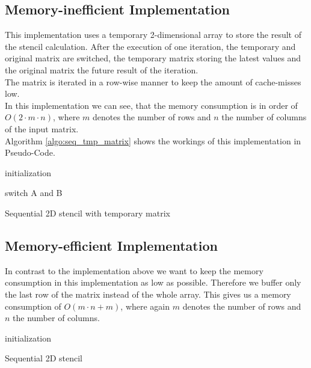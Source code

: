 \documentclass[11pt,a4paper]{article}
\begin{document}
\subsection{Memory-inefficient Implementation}
This implementation uses a temporary 2-dimensional array to store the result of the stencil calculation. After the execution of one iteration, the temporary and original matrix are switched, the temporary matrix storing the latest values and the original matrix the future result of the iteration.\\
The matrix is iterated in a row-wise manner to keep the amount of cache-misses low.\\
In this implementation we can see, that the memory consumption is in order of $O(2 \cdot m \cdot n)$, where $m$ denotes the number of rows and $n$ the number of columns of the input matrix.\\
Algorithm \ref{algo:seq_tmp_matrix} shows the workings of this implementation in Pseudo-Code.

\begin{algorithm}[H] \label{algo:seq_tmp_matrix}
 initialization\;
 
  {
  switch A and B
 }
 \caption{Sequential 2D stencil with temporary matrix}
\end{algorithm}

\subsection{Memory-efficient Implementation}
In contrast to the implementation above we want to keep the memory consumption in this implementation as low as possible. Therefore we buffer only the last row of the matrix instead of the whole array. This gives us a memory consumption of $O(m \cdot n + m)$, where again $m$ denotes the number of rows and $n$ the number of columns.\\

\begin{algorithm}[H] \label{algo:seq_tmp_matrix}
 initialization\;
 
 \caption{Sequential 2D stencil}
\end{algorithm}
\end{document}
